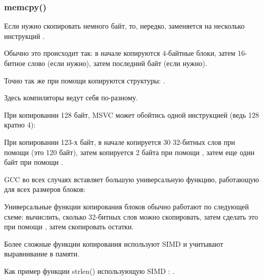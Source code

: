 \subsubsection{memcpy()}

\label{copying_short_blocks}

Если нужно скопировать немного байт, то, нередко, 
 заменяется на несколько инструкций \MOV.








Обычно это происходит так: в начале копируются 4-байтные блоки, затем 16-битное слово (если нужно), 
затем последний байт (если нужно).


Точно так же при помощи \MOV копируются структуры: .


Здесь компиляторы ведут себя по-разному.



При копировании 128 байт, MSVC может обойтись одной инструкцией  (ведь 128 кратно 4):




При копировании 123-х байт, в начале копируется 30 32-битных слов при помощи  
(это 120 байт), 
затем копируется 2 байта при помощи , 
затем еще один байт при помощи .




GCC во всех случаях вставляет большую универсальную функцию, работающую для всех размеров блоков:




Универсальные функции копирования блоков обычно работают по следующей схеме: 
вычислить, сколько 32-битных слов
можно скопировать, затем сделать это при помощи , затем скопировать остатки.


Более сложные функции копирования используют \ac{SIMD} и учитывают выравнивание в памяти.

Как пример функции strlen() использующую SIMD
: .

